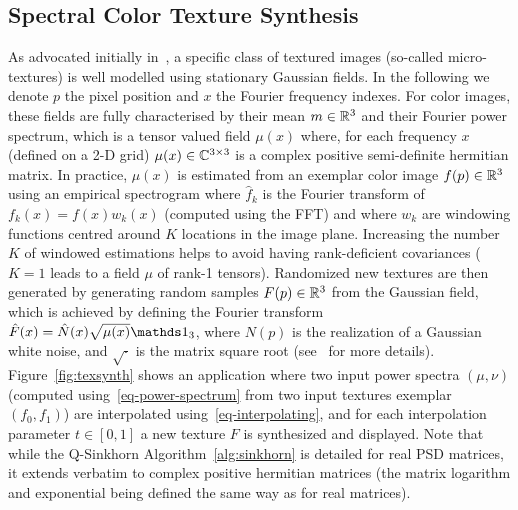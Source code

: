 

\subsection{Spectral Color Texture Synthesis}

As advocated initially in~\cite{galerne2011random}, a specific class of textured images (so-called micro-textures) is well modelled using stationary Gaussian fields. In the following we denote $p$ the pixel position and $x$ the Fourier frequency indexes. For color images, these fields are fully characterised by their mean $m \in \mathbb{R}^3$ and their Fourier power spectrum, which is a tensor valued field $\mu(x)$ where, for each frequency $x$ (defined on a 2-D grid) $\mu(x) \in \mathbb{C}^{3 \times 3}$ is a complex positive semi-definite hermitian matrix. 
%
In practice, $\mu(x)$ is estimated from an exemplar color image $f(p) \in \mathbb{R}^3$ using an empirical spectrogram 
where $\hat f_k$ is the Fourier transform of $f_k(x)=f(x) w_k(x)$ (computed using the FFT)
and where $w_k$ are windowing functions centred around $K$ locations in the image plane. 
%
Increasing the number $K$ of windowed estimations helps to avoid having rank-deficient covariances ($K=1$ leads to a field $\mu$ of rank-1 tensors).
%
Randomized new textures are then generated by generating random samples $F(p) \in \mathbb{R}^3$ from the Gaussian field, which is achieved by defining the Fourier transform $\hat F(x) = \hat N(x) \sqrt{\mu(x)} \ones_3$, where $N(p)$ is the realization of a Gaussian white noise, and $\sqrt{\cdot}$ is the matrix square root (see~\cite{galerne2011random} for more details).
%
Figure~\ref{fig:texsynth} shows an application where two input power spectra $(\mu,\nu)$ (computed using~\eqref{eq-power-spectrum} from two input textures exemplar $(f_0,f_1)$)  are interpolated using~\eqref{eq-interpolating}, and for each interpolation parameter $t \in [0,1]$ a new texture $F$ is synthesized and displayed.
%
Note that while the Q-Sinkhorn Algorithm~\ref{alg:sinkhorn} is detailed for real PSD matrices, it extends verbatim to complex positive hermitian matrices (the matrix logarithm and exponential being defined the same way as for real matrices).




